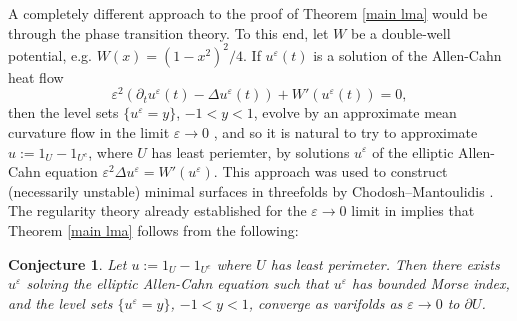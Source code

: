 \documentclass[reqno,10pt]{amsart}
\newcommand{\dfn}[1]{\emph{#1}\index{#1}}
\newtheorem{conjecture}[theorem]{Conjecture}
\theoremstyle{definition}
\numberwithin{equation}{section}
\begin{document}
A completely different approach to the proof of Theorem \ref{main lma} would be through the phase transition theory. 
To this end, let $W$ be a double-well potential, e.g. $W(x) = (1 - x^2)^2/4$.
If $u^\varepsilon(t)$ is a solution of the Allen-Cahn heat flow
$$\varepsilon^2(\partial_t u^\varepsilon(t) - \Delta u^\varepsilon(t)) + W'(u^\varepsilon(t)) = 0,$$
then the level sets $\{u^\varepsilon = y\}$, $-1 < y < 1$, evolve by an approximate mean curvature flow in the limit $\varepsilon \to 0$ \cite{Guaraco}, and so it is natural to try to approximate $u := 1_U - 1_{U^c}$, where $U$ has least periemter, by solutions $u^\varepsilon$ of the elliptic Allen-Cahn equation $\varepsilon^2 \Delta u^\varepsilon = W'(u^\varepsilon)$.
This approach was used to construct (necessarily unstable) minimal surfaces in threefolds by Chodosh--Mantoulidis \cite{Chodosh_2020}.
The regularity theory already established for the $\varepsilon \to 0$ limit in \cite[Appendix B]{Guaraco} implies that Theorem \ref{main lma} follows from the following:

\begin{conjecture}
Let $u := 1_U - 1_{U^c}$ where $U$ has least perimeter. Then there exists $u^\varepsilon$ solving the elliptic Allen-Cahn equation such that $u^\varepsilon$ has bounded Morse index, and the level sets $\{u^\varepsilon = y\}$, $-1 < y < 1$, converge as varifolds as $\varepsilon \to 0$ to $\partial U$.
\end{conjecture}


\end{document}
